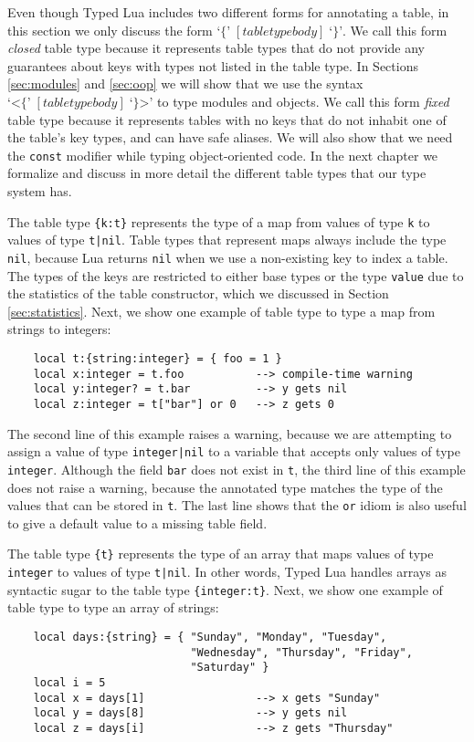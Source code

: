 Even though Typed Lua includes two different forms for annotating
a table, in this section we only discuss the form
$\texttt{`\{'} \; [\textit{tabletypebody}] \; \texttt{`\}'}$.
We call this form \emph{closed} table type because it
represents table types that do not provide
any guarantees about keys with types not listed in the table type.
In Sections \ref{sec:modules} and \ref{sec:oop} we will show that
we use the syntax $\texttt{`<\{'} \; [\textit{tabletypebody}] \; \texttt{`\}>'}$
to type modules and objects.
We call this form \emph{fixed} table type because it
represents tables with no keys that do not inhabit one of the table's
key types, and can have safe aliases.
We will also show that we need the \texttt{const} modifier while
typing object-oriented code.
In the next chapter we formalize and discuss in more detail the
different table types that our type system has.

The table type \texttt{\{k:t\}} represents the type of a map
from values of type \texttt{k} to values of type \texttt{t|nil}.
Table types that represent maps always include the type \texttt{nil},
because Lua returns \texttt{nil} when we use a non-existing key to
index a table. 
The types of the keys are restricted to either base types or the
type \texttt{value} due to the statistics of the table constructor,
which we discussed in Section \ref{sec:statistics}.
Next, we show one example of table type to type a map from strings to integers:
\begin{verbatim}
    local t:{string:integer} = { foo = 1 } 
    local x:integer = t.foo           --> compile-time warning
    local y:integer? = t.bar          --> y gets nil
    local z:integer = t["bar"] or 0   --> z gets 0 
\end{verbatim}

The second line of this example raises a warning, because we are
attempting to assign a value of type \texttt{integer|nil} to a
variable that accepts only values of type \texttt{integer}.
Although the field \texttt{bar} does not exist in \texttt{t}, the third
line of this example does not raise a warning, because the
annotated type matches the type of the values that can be stored in
\texttt{t}.
The last line shows that the \texttt{or} idiom is also useful to
give a default value to a missing table field.

The table type \texttt{\{t\}} represents the type of an array that 
maps values of type \texttt{integer} to values of type \texttt{t|nil}.
In other words, Typed Lua handles arrays as syntactic sugar to the
table type \texttt{\{integer:t\}}.
Next, we show one example of table type to type an array of strings:
\begin{verbatim}
    local days:{string} = { "Sunday", "Monday", "Tuesday",
                            "Wednesday", "Thursday", "Friday",
                            "Saturday" }
    local i = 5
    local x = days[1]                 --> x gets "Sunday"
    local y = days[8]                 --> y gets nil
    local z = days[i]                 --> z gets "Thursday"
\end{verbatim}

